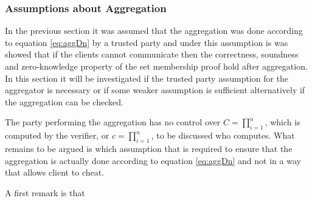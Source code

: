 \subsubsection*{Assumptions about Aggregation}
In the previous section it was assumed that the aggregation was done according to equation \eqref{eq:aggDn} by a trusted party and under this assumption is was showed that if the clients cannot communicate then the correctness, soundness and zero-knowledge property of the set membership proof hold after aggregation. In this section it will be investigated if the trusted party assumption for the aggregator is necessary or if some weaker assumption is sufficient alternatively if the aggregation can be checked. 


The party performing the aggregation has no control over $C =\prod_{i=1}^n$, which is computed by the verifier, or $c=\prod_{i=1}^n$, to be discussed who computes. %
What remains to be argued is which assumption that is required to ensure that the aggregation is actually done according to equation \ref{eq:aggDn} and not in a way that allows client to cheat. 

A first remark is that 

